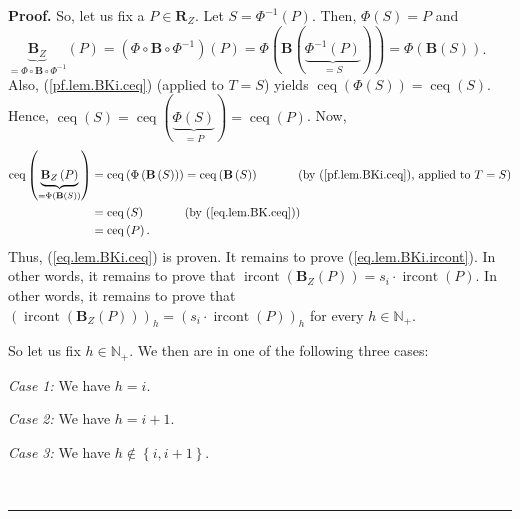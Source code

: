 \documentclass[numbers=enddot,12pt,final,onecolumn,notitlepage]{scrartcl}%
\theoremstyle{definition}
\newenvironment{proof}[1][Proof]{\noindent\textbf{#1.} }{\ \rule{0.5em}{0.5em}}
\newenvironment{verlong}{}{}
\begin{document}
\begin{verlong}
\begin{proof}
So, let us fix a $P\in\mathbf{R}_{Z}$. Let $S=\Phi^{-1}\left(  P\right)  $.
Then, $\Phi\left(  S\right)  =P$ and $\underbrace{\mathbf{B}_{Z}}_{=\Phi
\circ\mathbf{B}\circ\Phi^{-1}}\left(  P\right)  =\left(  \Phi\circ
\mathbf{B}\circ\Phi^{-1}\right)  \left(  P\right)  =\Phi\left(  \mathbf{B}%
\left(  \underbrace{\Phi^{-1}\left(  P\right)  }_{=S}\right)  \right)
=\Phi\left(  \mathbf{B}\left(  S\right)  \right)  $. Also,
(\ref{pf.lem.BKi.ceq}) (applied to $T=S$) yields $\operatorname*{ceq}\left(
\Phi\left(  S\right)  \right)  =\operatorname*{ceq}\left(  S\right)  $. Hence,
$\operatorname*{ceq}\left(  S\right)  =\operatorname*{ceq}\left(
\underbrace{\Phi\left(  S\right)  }_{=P}\right)  =\operatorname*{ceq}\left(
P\right)  $. Now,
\begin{align*}
\operatorname*{ceq}\left(  \underbrace{\mathbf{B}_{Z}\left(  P\right)
}_{=\Phi\left(  \mathbf{B}\left(  S\right)  \right)  }\right)   &
=\operatorname*{ceq}\left(  \Phi\left(  \mathbf{B}\left(  S\right)  \right)
\right)  =\operatorname*{ceq}\left(  \mathbf{B}\left(  S\right)  \right)
\ \ \ \ \ \ \ \ \ \ \left(  \text{by (\ref{pf.lem.BKi.ceq}), applied to
}T=S\right) \\
&  =\operatorname*{ceq}\left(  S\right)  \ \ \ \ \ \ \ \ \ \ \left(  \text{by
(\ref{eq.lem.BK.ceq})}\right) \\
&  =\operatorname*{ceq}\left(  P\right)  .
\end{align*}
Thus, (\ref{eq.lem.BKi.ceq}) is proven. It remains to prove
(\ref{eq.lem.BKi.ircont}). In other words, it remains to prove that
$\operatorname*{ircont}\left(  \mathbf{B}_{Z}\left(  P\right)  \right)
=s_{i}\cdot\operatorname*{ircont}\left(  P\right)  $. In other words, it
remains to prove that $\left(  \operatorname*{ircont}\left(  \mathbf{B}%
_{Z}\left(  P\right)  \right)  \right)  _{h}=\left(  s_{i}\cdot
\operatorname*{ircont}\left(  P\right)  \right)  _{h}$ for every
$h\in\mathbb{N}_{+}$.

So let us fix $h\in\mathbb{N}_{+}$. We then are in one of the following three cases:

\textit{Case 1:} We have $h=i$.

\textit{Case 2:} We have $h=i+1$.

\textit{Case 3:} We have $h\notin\left\{  i,i+1\right\}  $.


\end{proof}
\end{verlong}
\end{document}
